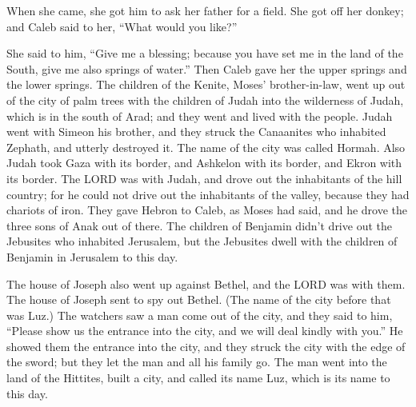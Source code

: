  When she came, she got him to ask her father for a field.
She got off her donkey; and Caleb said to her, ``What would you like?''

 She said to him, ``Give me a blessing; because you have
set me in the land of the South, give me also springs of water.'' Then
Caleb gave her the upper springs and the lower springs. 
The children of the Kenite, Moses' brother-in-law, went up out of the
city of palm trees with the children of Judah into the wilderness of
Judah, which is in the south of Arad; and they went and lived with the
people.  Judah went with Simeon his brother, and they
struck the Canaanites who inhabited Zephath, and utterly destroyed it.
The name of the city was called Hormah.  Also Judah took
Gaza with its border, and Ashkelon with its border, and Ekron with its
border.  The LORD was with Judah, and drove out the
inhabitants of the hill country; for he could not drive out the
inhabitants of the valley, because they had chariots of iron.
 They gave Hebron to Caleb, as Moses had said, and he drove
the three sons of Anak out of there.  The children of
Benjamin didn't drive out the Jebusites who inhabited Jerusalem, but the
Jebusites dwell with the children of Benjamin in Jerusalem to this day.

 The house of Joseph also went up against Bethel, and the
LORD was with them.  The house of Joseph sent to spy out
Bethel. (The name of the city before that was Luz.)  The
watchers saw a man come out of the city, and they said to him, ``Please
show us the entrance into the city, and we will deal kindly with you.''
 He showed them the entrance into the city, and they struck
the city with the edge of the sword; but they let the man and all his
family go.  The man went into the land of the Hittites,
built a city, and called its name Luz, which is its name to this day.

